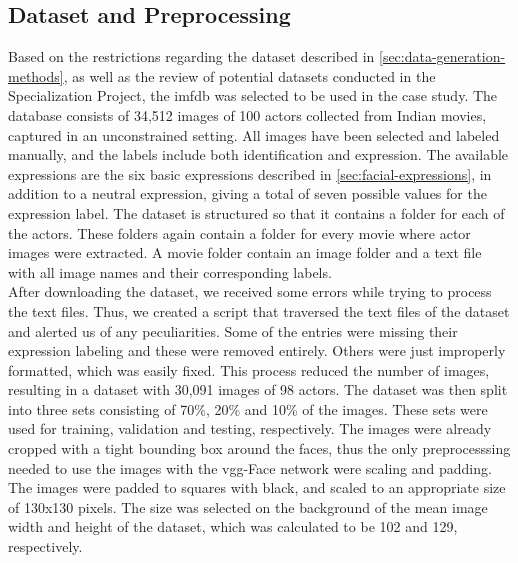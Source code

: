 \subsection{Dataset and Preprocessing}

Based on the restrictions regarding the dataset described in \autoref{sec:data-generation-methods}, as well as the review of potential datasets conducted in the Specialization Project, the \acrfull{imfdb} \cite{imfdb} was selected to be used in the case study. The database consists of 34,512 images of 100 actors collected from Indian movies, captured in an unconstrained setting. All images have been selected and labeled manually, and the labels include both identification and expression. The available expressions are the six basic expressions described in \autoref{sec:facial-expressions}, in addition to a neutral expression, giving a total of seven possible values for the expression label. The dataset is structured so that it contains a folder for each of the actors. These folders again contain a folder for every movie where actor images were extracted. A movie folder contain an image folder and a text file with all image names and their corresponding labels. \\

\noindent After downloading the dataset, we received some errors while trying to process the text files. Thus, we created a script that traversed the text files of the dataset and alerted us of any peculiarities. Some of the entries were missing their expression labeling and these were removed entirely. Others were just improperly formatted, which was easily fixed. This process reduced the number of images, resulting in a dataset with 30,091 images of 98 actors. The dataset was then split into three sets consisting of 70\%, 20\% and 10\% of the images. These sets were used for training, validation and testing, respectively. The images were already cropped with a tight bounding box around the faces, thus the only preprocesssing needed to use the images with the \acrshort{vgg}-Face network were scaling and padding. The images were padded to squares with black, and scaled to an appropriate size of 130x130 pixels. The size was selected on the background of the mean image width and height of the dataset, which was calculated to be 102 and 129, respectively. \\

